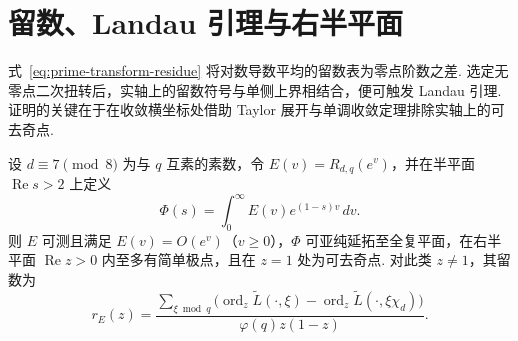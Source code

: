 \section{留数、Landau 引理与右半平面}
\label{sec:landau-criterion}

式~\eqref{eq:prime-transform-residue} 将对数导数平均的留数表为零点阶数之差. 选定无零点二次扭转后，实轴上的留数符号与单侧上界相结合，便可触发 Landau 引理. 证明的关键在于在收敛横坐标处借助 Taylor 展开与单调收敛定理排除实轴上的可去奇点.

\begin{lemma}[素数余项的变换与留数]
\label{lem:prime-transform}
\emitthmsource
设 $d\equiv7\pmod8$ 为与 $q$ 互素的素数，令 $E(v)=R_{d,q}(e^v)$，并在半平面 $\operatorname{Re}s>2$ 上定义
\[
 \Phi(s)=\int_0^\infty E(v)e^{(1-s)v}\,dv.
\]
则 $E$ 可测且满足 $E(v)=O(e^v)$（$v\ge0$），$\Phi$ 可亚纯延拓至全复平面，在右半平面 $\operatorname{Re}z>0$ 内至多有简单极点，且在 $z=1$ 处为可去奇点. 对此类 $z\ne1$，其留数为
\begin{equation}\label{eq:prime-transform-residue}
 r_E(z)=\frac{\sum_{\xi\bmod q}
  \bigl(\operatorname{ord}_z\widetilde L(\cdot,\xi)
       -\operatorname{ord}_z\widetilde L(\cdot,\xi\chi_d)\bigr)}
  {\varphi(q)z(1-z)}.
\end{equation}
\end{lemma}
